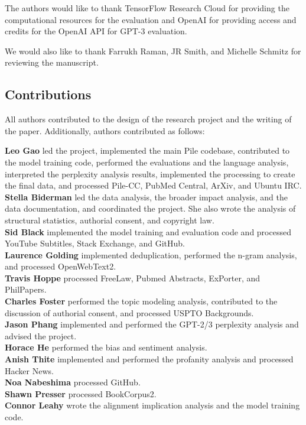 \documentclass[11pt,a4paper]{article}
\begin{document}
The authors would like to thank TensorFlow Research Cloud for providing the computational resources for the evaluation and OpenAI for providing access and credits for the OpenAI API for GPT-3 evaluation.

We would also like to thank Farrukh Raman, JR Smith, and Michelle Schmitz for reviewing the manuscript.




\clearpage

\begin{appendices}

\section{Contributions}\label{apdx:contributions}

All authors contributed to the design of the research project and the writing of the paper. Additionally, authors contributed as follows:

\textbf{Leo Gao} led the project, implemented the main Pile codebase, contributed to the model training code, performed the evaluations and the language analysis, interpreted the perplexity analysis results, implemented the processing to create the final data, and processed Pile-CC, PubMed Central, ArXiv, and Ubuntu IRC.\\
\textbf{Stella Biderman} led the data analysis, the broader impact analysis, and the data documentation, and coordinated the project. She also wrote the analysis of structural statistics, authorial consent, and copyright law.\\
\textbf{Sid Black} implemented the model training and evaluation code and processed YouTube Subtitles, Stack Exchange, and GitHub. \\
\textbf{Laurence Golding} implemented deduplication, performed the n-gram analysis, and processed OpenWebText2. \\
\textbf{Travis Hoppe} processed FreeLaw, Pubmed Abstracts, ExPorter, and PhilPapers. \\
\textbf{Charles Foster} performed the topic modeling analysis, contributed to the discussion of authorial consent, and processed USPTO Backgrounds. \\
\textbf{Jason Phang} implemented and performed the GPT-2/3 perplexity analysis and advised the project. \\
\textbf{Horace He} performed the bias and sentiment analysis. \\
\textbf{Anish Thite} implemented and performed the profanity analysis and processed Hacker News. \\
\textbf{Noa Nabeshima} processed GitHub. \\
\textbf{Shawn Presser} processed BookCorpus2.\\
\textbf{Connor Leahy} wrote the alignment implication analysis and the model training code.



\end{appendices}
\end{document}
